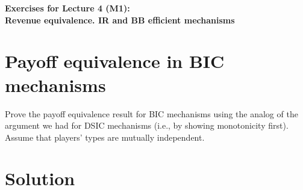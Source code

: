 \documentclass[a4paper]{article}
\newif\ifsolutions
\begin{document}
\begin{center}
		\LARGE\textbf{Exercises for Lecture 4 (M1):\\ Revenue equivalence. IR and BB efficient mechanisms}
\end{center}



\section{Payoff equivalence in BIC mechanisms}

	Prove the payoff equivalence result for BIC mechanisms using the analog of the argument we had for DSIC mechanisms (i.e., by showing monotonicity first). Assume that players' types are mutually independent.
	
\ifsolutions
\section*{Solution}
\end{document}
